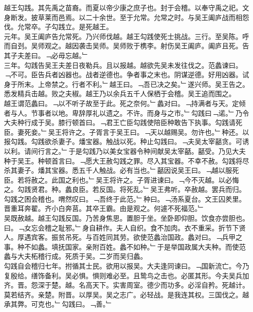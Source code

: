 \documentclass{zhvt-classic}
\begin{document}

\hspace*{2em}越王勾践。其先禹之苗裔。而夏以帝少康之庶子也。封于会稽。以奉守禹之祀。文身断发。披草莱而邑焉。以二十余世。至于允常。允常之时。与吴王阖庐战而相怨伐。允常卒。子勾践立。是死越王。\\
\hspace*{2em}元年。吴王阖庐告允常死。乃兴师伐越。越王勾践使死士挑战。三行。至吴陈。呼而自刭。吴师观之。越因袭击吴师。吴师败于槜李。射伤吴王阖庐。阖庐且死。告其子夫差曰。﹁必毋忘越。﹂\\
\hspace*{2em}三年。勾践告吴王夫差日夜勒兵。且以报越。越欲先吴未发往伐之。范蠡谏曰。﹁不可。臣告兵者凶器也。战者逆德也。争者事之末也。阴谋逆德。好用凶器。试身于所末。上帝禁之。行者不利。﹂越王曰。﹁吾已决之矣。﹂遂兴师。吴王告之。悉发精兵击越。败之夫椒。越王乃以余兵五千人保栖于会稽。吴王追而围之。\\
\hspace*{2em}越王谓范蠡曰。﹁以不听子故至于此。死之奈何。﹂蠡对曰。﹁持满者与天。定倾者与人。节事者以地。卑辞厚礼以遗之。不许。而身与之市。﹂勾践曰﹁诺。﹂乃令大夫种行成于吴。膝行顿首曰。﹁君王亡臣勾践使陪臣种敢告下执事。勾践请死臣。妻死妾。﹂吴王将许之。子胥言于吴王曰。﹁天以越赐吴。勿许也。﹂种还。以报勾践。勾践欲杀妻子。燔宝器。触战以死。种止勾践曰。﹁夫吴太宰嚭贪。可诱以利。请间行言之。﹂于是勾践乃以美女宝器令种间献吴太宰嚭。嚭受。乃见大夫种于吴王。种顿首言曰。﹁愿大王赦勾践之罪。尽入其宝器。不幸不赦。勾践将尽杀其妻子。燔其宝器。悉五千人触战。必有当也。﹂嚭因说吴王曰。﹁越以服死臣。若将赦之。此国之利也。﹂吴王将许之。子胥进谏曰。﹁今不灭越。以必悔之。勾践贤君。种。蠡良臣。若反国。将死乱。﹂吴王弗听。卒赦越。罢兵而归。\\
\hspace*{2em}勾践之困会稽也。喟然叹曰。﹁吾终于此范。﹂种曰。﹁汤系夏台。文王囚羑里。晋重耳奔翟。齐小白奔莒。其卒王霸。由是观之。何遽不死福范。﹂\\
\hspace*{2em}吴既赦越。越王勾践反国。乃苦身焦思。置胆于坐。坐卧即仰胆。饮食亦尝胆也。曰。﹁女忘会稽之耻邪。﹂身自耕作。夫人自织。食不加肉。衣不重采。折节下贤人。厚遇宾客。振贫吊死。与百姓同其劳。欲使范蠡治国政。蠡对曰。﹁兵甲之事。种不如蠡。填抚国家。亲附百姓。蠡不如种。﹂于是举国政属大夫种。而使范蠡与大夫柘稽行成。死质于吴。二岁而吴归蠡。\\
\hspace*{2em}勾践自会稽归七年。拊循其士民。欲用以报吴。大夫逢同谏曰。﹁国新流亡。今乃复殷给。缮饰备利。吴必惧。惧则难必至。且鸷鸟之击也。必匿其形。今夫吴兵加齐。晋。怨深于楚。越。名高天下。实害周室。德少而功多。必淫自矜。死越计。莫若结齐。亲楚。附晋。以厚吴。吴之志广。必轻战。是我连其权。三国伐之。越承其弊。可克也。﹂勾践曰。﹁善。﹂\\
\end{document}
